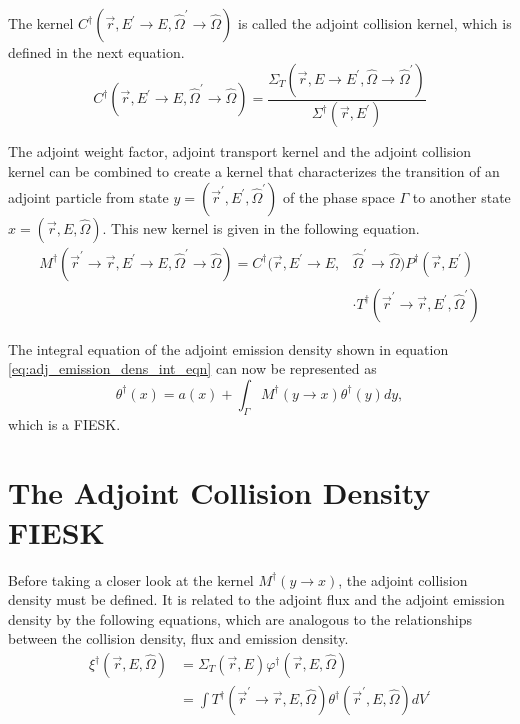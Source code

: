 The kernel $C^{\dagger}(\vec{r},E^{'} \to E,\hat{\Omega}^{'} \to \hat{\Omega})$ is
called the adjoint collision kernel, which is defined in the next equation.
\begin{equation}
  C^{\dagger}(\vec{r},E^{'} \to E,\hat{\Omega}^{'} \to \hat{\Omega}) = 
  \frac{\Sigma_T(\vec{r},E \to E^{'},\hat{\Omega} \to \hat{\Omega}^{'})}
       {\Sigma^{\dagger}(\vec{r},E^{'})}
  \label{eq:adj_collision_kernel}
\end{equation}

The adjoint weight factor, adjoint transport kernel and the adjoint collision
kernel can be combined to create a kernel that characterizes the transition of
an adjoint particle from state $y = (\vec{r}^{'},E^{'},\hat{\Omega}^{'})$ of the 
phase space $\Gamma$ to another state $x = (\vec{r},E,\hat{\Omega})$. This new 
kernel is given in the following equation.
\begin{equation}
  \begin{split}
    M^{\dagger}(\vec{r}^{'} \to \vec{r},E^{'} \to E,\hat{\Omega}^{'} \to \hat{\Omega})
    = C^{\dagger}(\vec{r},E^{'} \to E,&\hat{\Omega}^{'} \to \hat{\Omega})
    P^{\dagger}(\vec{r},E^{'}) \\
    & \cdot T^{\dagger}(\vec{r}^{'} \to \vec{r},E^{'},\hat{\Omega}^{'})
  \end{split}
  \label{eq:adj_emission_dens_kernel}
\end{equation}

The integral equation of the adjoint emission density shown in equation 
\ref{eq:adj_emission_dens_int_eqn} can now be represented as
\begin{equation*}
  \theta^{\dagger}(x) = a(x) + \int_{\Gamma}M^{\dagger}(y \to x) \theta^{\dagger}(y)dy,
\end{equation*}
which is a FIESK.

\section{The Adjoint Collision Density FIESK}
Before taking a closer look at the kernel $M^{\dagger}(y \to x)$, the adjoint
collision density must be defined. It is related to the adjoint flux and the
adjoint emission density by the following equations, which are analogous to
the relationships between the collision density, flux and emission density.
\begin{align}
  \xi^{\dagger}(\vec{r},E,\hat{\Omega}) & = \Sigma_T(\vec{r},E)
  \varphi^{\dagger}(\vec{r},E,\hat{\Omega}) \\
  & = \int T^{\dagger}(\vec{r}^{'} \to \vec{r},E,\hat{\Omega})
  \theta^{\dagger}(\vec{r}^{'},E,\hat{\Omega}) dV^{'}
  \label{eq:adj_collision_dens_to_adj_emission_dens}
\end{align}

